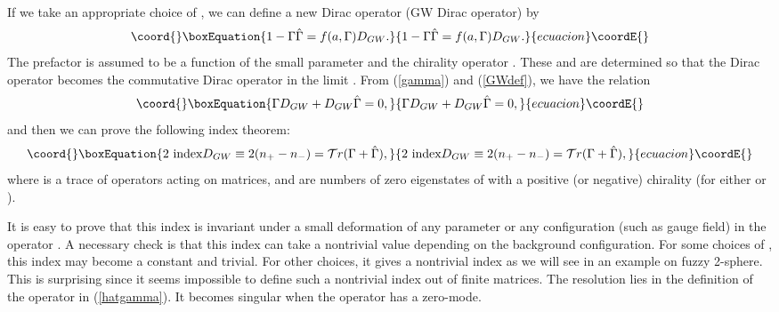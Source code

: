 \documentclass[a4paper,prl,showpacs,twocolumn]{revtex4}
\begin{document}
If we take an appropriate choice of \coordHE{}, we can define a new
Dirac operator (GW Dirac operator) \coordHE{} by
\begin{equation}\coord{}\boxEquation{
1- \Gamma \hat{\Gamma} = f(a,\Gamma) D_{GW}.
\label{GWdef}
}{
1- \Gamma \hat{\Gamma} = f(a,\Gamma) D_{GW}.
}{ecuacion}\coordE{}\end{equation}
The prefactor \coordHE{} is assumed to be a function of 
the small parameter \coordHE{} and the chirality operator \myHighlight{$\Gamma$}\coordHE{}. 
These \coordHE{} and \coordHE{} are determined so that the Dirac operator 
\coordHE{} becomes the commutative Dirac 
operator in the limit \coordHE{}.
From (\ref{gamma}) and (\ref{GWdef}), we have the relation
\begin{equation}\coord{}\boxEquation{
\Gamma D_{GW}+D_{GW} \hat{\Gamma}=0,
\label{GWnew}
}{
\Gamma D_{GW}+D_{GW} \hat{\Gamma}=0,
}{ecuacion}\coordE{}\end{equation}
and then we can prove the following index theorem:
\begin{equation}\coord{}\boxEquation{
2 \ {\text {index}}D_{GW} \equiv 2(n_+ - n_-) = 
{\cal T}r (\Gamma + \hat{\Gamma}),
\label{indexth}
}{
2 \ {\text {index}}D_{GW} \equiv 2(n_+ - n_-) = 
{\cal T}r (\Gamma + \hat{\Gamma}),
}{ecuacion}\coordE{}\end{equation}
where \coordHE{} is a trace of operators acting on matrices, 
and \coordHE{} are numbers of zero eigenstates of \coordHE{}
with a positive (or negative) chirality (for either \myHighlight{$\Gamma$}\coordHE{}
or \myHighlight{$\hat{\Gamma}$}\coordHE{}).
\par
It is easy to prove that this index is invariant
under a small deformation of any parameter or any
configuration (such as gauge field) in the operator \coordHE{}.
A necessary check is that this index can take a nontrivial
value depending on the background configuration.
For some choices of \coordHE{}, this index may become a constant
and trivial. For other choices, it gives a nontrivial 
index as we will see in an example on fuzzy 2-sphere.
This is surprising since it seems impossible to define such a
nontrivial index out of finite matrices. The resolution lies in the
definition of the operator \myHighlight{$\hat{\Gamma}$}\coordHE{} in  (\ref{hatgamma}). 
It becomes singular when the operator \coordHE{} has a zero-mode.
\end{document}
